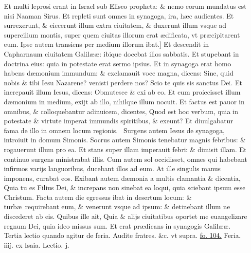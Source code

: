 \documentclass[a5paper,10pt]{book}
\def\leftmarginnote{%
	\lrmarginnote{\hskip -\marginparsep \hskip -6.5em}}
\def\ae{æ}
\begin{document}
\begin{multicols*}{2}
Et multi leprosi erant in Israel sub Eliseo propheta: \& nemo eorum mundatus est nisi Naaman Sirus. Et repleti sunt omnes in synagoga, ira, h\ae c audientes.
Et surrexerunt, \& eiecerunt illum extra ciuitatem, \& duxerunt illum vsque ad supercilium montis, super quem ciuitas illorum erat \ae dificata, vt pr\ae cipitarent eum.
Ipse autem transiens per medium illorum ibat.]
Et\leftmarginnote{\begin{flushright}D\end{flushright}} descendit in Capharnaum ciuitatem Galil\ae \ae : ibique docebat illos sabbatis.
Et stupebant in doctrina eius: quia in potestate erat sermo ipsius.
Et in synagoga erat homo habens d\ae monium immundum: \& exclamauit voce magna, dicens: Sine, quid nobis \& tibi Iesu Nazarene? venisti perdere nos? Scio te quis sis sanctus Dei.
Et increpauit illum Iesus, dicens: Obmutesce \& exi ab eo. Et cum proiecisset illum d\ae monium in medium, exijt ab illo, nihilque illum nocuit.
Et factus est pauor in omnibus, \& colloquebantur
adinuicem, dicentes, Quod est hoc verbum, quia in potestate \& virtute imperat immundis spiritibus, \& exeunt?
Et diuulgabatur fama de illo in omnem locum regionis. \textdagger \ 
Surgens\leftmarginnote{\begin{flushright}E\end{flushright}} autem Iesus de synagoga, introiuit in domum Simonis.
Socrus autem Simonis tenebatur magnis febribus: \& rogauerunt illum pro ea.
Et stans super illam imperauit febri: \& dimisit illam. Et continuo surgens ministrabat illis.
Cum autem sol occidisset, omnes qui habebant infirmos varijs languoribus, ducebant illos ad eum.
At ille singulis manus imponens, curabat eos.
Exibant autem d\ae monia a multis clamantia \& dicentia, Quia tu es Filius Dei, \& increpans non sinebat ea loqui, quia sciebant ipsum esse Christum. 
Facta autem die egressus ibat in desertum locum: \& turb\ae \ requirebant eum, \& venerunt vsque ad ipsum: \& detinebant illum ne discederet ab eis.
Quibus ille ait, Quia \& alijs ciuitatibus oportet me euangelizare regnum Dei, quia ideo missus sum.
Et erat pr\ae dicans in synagogis Galil\ae \ae .
\newline \color{red} Tertia lectio quando agitur de feria. \color{black} Audite fratres. \&c. \color{red} vt supra. \color{black} \hyperlink{page.104}{fo. 104.}
\newline \textswab{C} \color{red} \hypertarget{WED-SECUNDA-ADV}{Feria. iiij.} ex Isaia. \hfill Lectio. j. \color{black}
\bookmark[dest=WED-SECUNDA-ADV]{FERIA QVARTA}
\vspace{-.25em}

\end{multicols*}
\end{document}
